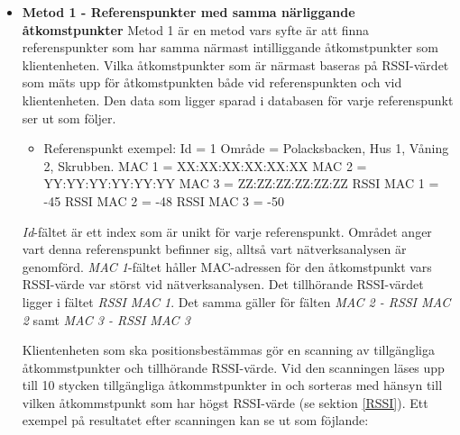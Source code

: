 \documentclass[swedish, a4paper,12pt]{article}
\begin{document}
\begin{itemize}
  \item {\textbf{Metod 1 - Referenspunkter med samma närliggande åtkomstpunkter}
  \bigskip
  \newline
  Metod 1 är en metod vars syfte är att finna referenspunkter som har samma närmast intilliggande åtkomstpunkter som klientenheten. Vilka åtkomstpunkter som är närmast baseras på RSSI-värdet som mäts upp för åtkomstpunkten både vid referenspunkten och vid klientenheten. Den data som ligger sparad i databasen för varje referenspunkt ser ut som följer.
  \begin{itemize}
    \item Referenspunkt exempel:
          \newline Id = 1
          \newline Område = Polacksbacken, Hus 1, Våning 2, Skrubben.
          \newline MAC 1 = XX:XX:XX:XX:XX:XX
          \newline MAC 2 = YY:YY:YY:YY:YY:YY
          \newline MAC 3 = ZZ:ZZ:ZZ:ZZ:ZZ:ZZ
          \newline RSSI MAC 1 = -45
          \newline RSSI MAC 2 = -48
          \newline RSSI MAC 3 = -50
  \end{itemize}
\textit{Id}-fältet är ett index som är unikt för varje referenspunkt. Området anger vart denna referenspunkt befinner sig, alltså vart nätverksanalysen är genomförd. \textit{MAC 1}-fältet håller MAC-adressen för den åtkomstpunkt vars RSSI-värde var störst vid nätverksanalysen. Det tillhörande RSSI-värdet ligger i fältet \textit{RSSI MAC 1}.
Det samma gäller för fälten \textit{MAC 2 - RSSI MAC 2} samt \textit{MAC 3 - RSSI MAC 3}

Klientenheten som ska positionsbestämmas gör en scanning av tillgängliga åtkommstpunkter och tillhörande RSSI-värde. Vid den scanningen läses upp till 10 stycken tillgängliga åtkommstpunkter in och sorteras med hänsyn till vilken åtkommstpunkt som har högst RSSI-värde (se sektion \ref{RSSI}). Ett exempel på resultatet efter scanningen kan se ut som föjlande:

}
\end{itemize}
\end{document}
